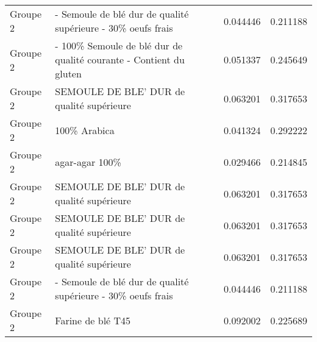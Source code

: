 \begin{tabular}{llcc}
Groupe 2 &        - Semoule de blé dur de qualité supérieure \newline - 30\% oeufs frais &  0.044446 &  0.211188 \\
Groupe 2 &  - 100\% Semoule de blé dur de qualité courante \newline - Contient du gluten &  0.051337 &  0.245649 \\
Groupe 2 &                            SEMOULE DE BLE' DUR de qualité supérieure &  0.063201 &  0.317653 \\
Groupe 2 &                                                         100\% Arabica &  0.041324 &  0.292222 \\
Groupe 2 &                                                       agar-agar 100\% &  0.029466 &  0.214845 \\
Groupe 2 &                            SEMOULE DE BLE' DUR de qualité supérieure &  0.063201 &  0.317653 \\
Groupe 2 &                            SEMOULE DE BLE' DUR de qualité supérieure &  0.063201 &  0.317653 \\
Groupe 2 &                            SEMOULE DE BLE' DUR de qualité supérieure &  0.063201 &  0.317653 \\
Groupe 2 &        - Semoule de blé dur de qualité supérieure \newline - 30\% oeufs frais &  0.044446 &  0.211188 \\
Groupe 2 &                                                    Farine de blé T45 &  0.092002 &  0.225689 \\
\bottomrule
\end{tabular}
